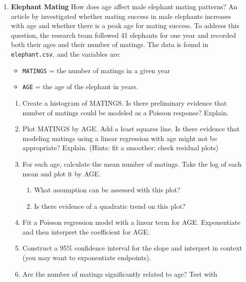 \documentclass[
]{krantz}
\providecommand{\tightlist}{%
  \setlength{\itemsep}{0pt}\setlength{\parskip}{0pt}}
\begin{document}
\begin{enumerate}
\def\labelenumi{\arabic{enumi}.}
\setcounter{enumi}{1}
\tightlist
\item
  \textbf{Elephant Mating} How does age affect male elephant mating patterns? An article by \citet{Poole1989} investigated whether mating success in male elephants increases with age and whether there is a peak age for mating success. To address this question, the research team followed 41 elephants for one year and recorded both their ages and their number of matings. The data is found in \texttt{elephant.csv}, and the variables are:

  \begin{itemize}
  \tightlist
  \item
    \texttt{MATINGS} = the number of matings in a given year
  \item
    \texttt{AGE} = the age of the elephant in years.
  \end{itemize}

  \begin{enumerate}
  \def\labelenumii{\alph{enumii}.}
  \tightlist
  \item
    Create a histogram of MATINGS. Is there preliminary evidence that number of matings could be modeled as a Poisson response? Explain.
  \item
    Plot MATINGS by AGE. Add a least squares line. Is there evidence that modeling matings using a linear regression with age might not be appropriate? Explain. (Hints: fit a smoother; check residual plots)
  \item
    For each age, calculate the mean number of matings. Take the log of each mean and plot it by AGE.

    \begin{enumerate}
    \def\labelenumiii{\roman{enumiii}.}
    \tightlist
    \item
      What assumption can be assessed with this plot?
    \item
      Is there evidence of a quadratic trend on this plot?
    \end{enumerate}
  \item
    Fit a Poisson regression model with a linear term for AGE. Exponentiate and then interpret the coefficient for AGE.
  \item
    Construct a 95\% confidence interval for the slope and interpret in context (you may want to exponentiate endpoints).
  \item
    Are the number of matings significantly related to age? Test with


\end{enumerate}
\end{enumerate}
\end{document}
